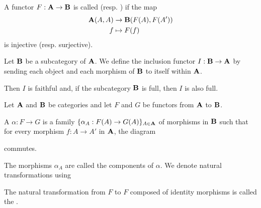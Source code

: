 \begin{definition}\label{def:faithful_full_functor}\cite[definition 1.2.16]{Leinster2014}
  A functor $F: \operatorname{\mathbf{A}} \to \operatorname{\mathbf{B}}$ is called  (resp. ) if the map
  \begin{align*}
    \operatorname{\mathbf{A}}(A, A) &\to \operatorname{\mathbf{B}}(F(A), F(A')) \\
    f &\mapsto F(f)
  \end{align*}
  is injective (resp. surjective).
\end{definition}

\begin{example}\label{def:subcategory_functors}\cite[25]{Leinster2014}
  Let $\operatorname{\mathbf{B}}$ be a subcategory of $\operatorname{\mathbf{A}}$. We define the inclusion functor $I: \operatorname{\mathbf{B}} \to \operatorname{\mathbf{A}}$ by sending each object and each morphism of $\operatorname{\mathbf{B}}$ to itself within $\operatorname{\mathbf{A}}$.

  Then $I$ is faithful and, if the subcategory $\operatorname{\mathbf{B}}$ is full, then $I$ is also full.
\end{example}

\begin{definition}\label{def:natural_transformation}\cite[definition 1.3.1]{Leinster2014}
  Let $\operatorname{\mathbf{A}}$ and $\operatorname{\mathbf{B}}$ be categories and let $F$ and $G$ be functors from $\operatorname{\mathbf{A}}$ to $\operatorname{\mathbf{B}}$.

  A  $\alpha: F \to G$ is a family $\{ \alpha_A: F(A) \to G(A) \}_{A \in \operatorname{\mathbf{A}}}$ of morphisms in $\operatorname{\mathbf{B}}$ such that for every morphism $f: A \to A'$ in $\operatorname{\mathbf{A}}$, the diagram
  \begin{Center}
  \end{Center}
  commutes.

  The morphisms $\alpha_A$ are called the components of $\alpha$. We denote natural transformations using
  \begin{Center}
  \end{Center}

  The natural transformation from $F$ to $F$ composed of identity morphisms is called the .
\end{definition}

